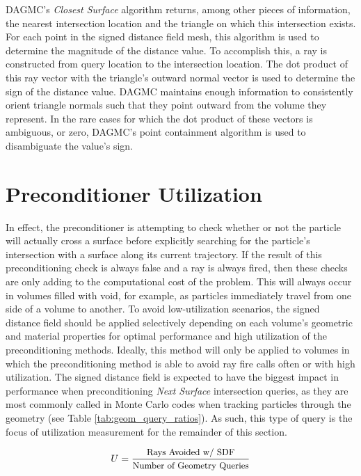 DAGMC's \textit{Closest Surface} algorithm returns, among other pieces of
information, the nearest intersection location and the triangle on which this
intersection exists. For each point in the signed distance field mesh, this
algorithm is used to determine the magnitude of the distance value. To
accomplish this, a ray is constructed from query location to the intersection
location. The dot product of this ray vector with the triangle's outward normal
vector is used to determine the sign of the distance value. DAGMC maintains
enough information to consistently orient triangle normals such that they point
outward from the volume they represent. In the rare cases for which the dot
product of these vectors is ambiguous, or zero, DAGMC's point containment
algorithm is used to disambiguate the value's sign.

\section{Preconditioner Utilization}\label{sec:preconditioner_utilization}

In effect, the preconditioner is attempting to check whether or not the particle
will actually cross a surface before explicitly searching for the particle's
intersection with a surface along its current trajectory. If the result of this
preconditioning check is always false and a ray is always fired, then these
checks are only adding to the computational cost of the problem. This will
always occur in volumes filled with void, for example, as particles immediately
travel from one side of a volume to another. To avoid low-utilization scenarios,
the signed distance field should be applied selectively depending on each
volume's geometric and material properties for optimal performance and high
utilization of the preconditioning methods. Ideally, this method will only be
applied to volumes in which the preconditioning method is able to avoid ray fire
calls often or with high utilization. The signed distance field is expected to
have the biggest impact in performance when preconditioning \textit{Next Surface}
intersection queries, as they are most commonly called in Monte Carlo codes when
tracking  particles through the geometry (see Table
\ref{tab:geom_query_ratios}). As such, this type of query is the focus of
utilization measurement for the remainder of this section.


\begin{equation}
  U = \frac{ \small \text{Rays Avoided w/ SDF} }{ \small \text{Number of Geometry Queries} } 
   \label{eq:preconditioner_utilization}
\end{equation}

